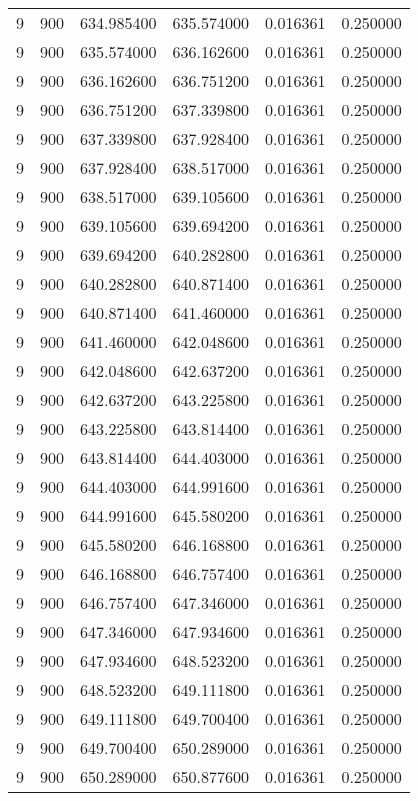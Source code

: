 \begin{longtable}{rrrrrr}
9 & 900 & 634.985400 & 635.574000 & 0.016361 & 0.250000 \\
9 & 900 & 635.574000 & 636.162600 & 0.016361 & 0.250000 \\
9 & 900 & 636.162600 & 636.751200 & 0.016361 & 0.250000 \\
9 & 900 & 636.751200 & 637.339800 & 0.016361 & 0.250000 \\
9 & 900 & 637.339800 & 637.928400 & 0.016361 & 0.250000 \\
9 & 900 & 637.928400 & 638.517000 & 0.016361 & 0.250000 \\
9 & 900 & 638.517000 & 639.105600 & 0.016361 & 0.250000 \\
9 & 900 & 639.105600 & 639.694200 & 0.016361 & 0.250000 \\
9 & 900 & 639.694200 & 640.282800 & 0.016361 & 0.250000 \\
9 & 900 & 640.282800 & 640.871400 & 0.016361 & 0.250000 \\
9 & 900 & 640.871400 & 641.460000 & 0.016361 & 0.250000 \\
9 & 900 & 641.460000 & 642.048600 & 0.016361 & 0.250000 \\
9 & 900 & 642.048600 & 642.637200 & 0.016361 & 0.250000 \\
9 & 900 & 642.637200 & 643.225800 & 0.016361 & 0.250000 \\
9 & 900 & 643.225800 & 643.814400 & 0.016361 & 0.250000 \\
9 & 900 & 643.814400 & 644.403000 & 0.016361 & 0.250000 \\
9 & 900 & 644.403000 & 644.991600 & 0.016361 & 0.250000 \\
9 & 900 & 644.991600 & 645.580200 & 0.016361 & 0.250000 \\
9 & 900 & 645.580200 & 646.168800 & 0.016361 & 0.250000 \\
9 & 900 & 646.168800 & 646.757400 & 0.016361 & 0.250000 \\
9 & 900 & 646.757400 & 647.346000 & 0.016361 & 0.250000 \\
9 & 900 & 647.346000 & 647.934600 & 0.016361 & 0.250000 \\
9 & 900 & 647.934600 & 648.523200 & 0.016361 & 0.250000 \\
9 & 900 & 648.523200 & 649.111800 & 0.016361 & 0.250000 \\
9 & 900 & 649.111800 & 649.700400 & 0.016361 & 0.250000 \\
9 & 900 & 649.700400 & 650.289000 & 0.016361 & 0.250000 \\
9 & 900 & 650.289000 & 650.877600 & 0.016361 & 0.250000 \\

\end{longtable}
